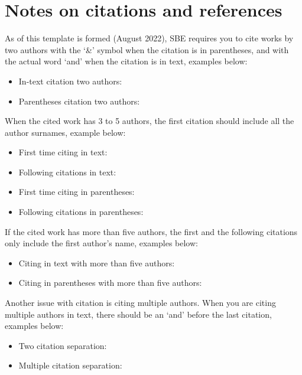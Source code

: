 \section{Notes on citations and references}

As of this template is formed (August 2022), SBE requires you to cite works by two authors with the `\&' symbol when the citation is in parentheses, and with the actual word `and' when the citation is in text, examples below:

\begin{itemize}
    \item In-text citation two authors: \citet{LogacevVasishth2012} 
    \item Parentheses citation two authors: \citep{LogacevVasishth2012}
\end{itemize}

When the cited work has 3 to 5 authors, the first citation should include all the author surnames, example below:

\begin{itemize}
    \item First time citing in text: \citet{FedorenkoEtAl2004}
    \item Following citations in text: \citet{FedorenkoEtAl2004}
    \item First time citing in parentheses: \citep{AcunaEtAl2014} 
    \item Following citations in parentheses: \citep{AcunaEtAl2014} 
\end{itemize}

If the cited work has more than five authors, the first and the following citations only include the first author's name, examples below:

\begin{itemize}
    \item Citing in text with more than five authors: \citet{turk2022resources}
    \item Citing in parentheses with more than five authors: \citep{turk2022resources}
\end{itemize}

Another issue with citation is citing multiple authors. When you are citing multiple authors in text, there should be an `and' before the last citation, examples below:

\begin{itemize}
    \item Two citation separation: \citet{atmaca2020,turk2022resources}
    \item Multiple citation separation: \citet{atmaca2020,turk2022attraction,turk2022resources}
\end{itemize}

